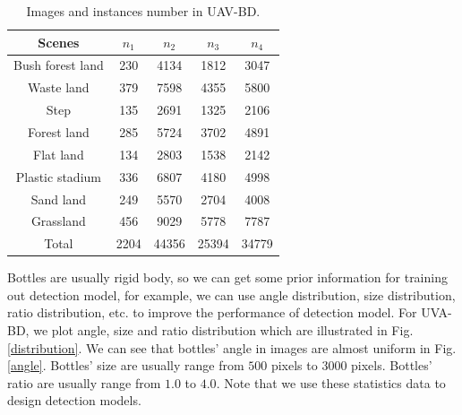 \begin{table}
	\centering
	\small
	\caption{Images and instances number in UAV-BD.}
	\label{statistics}
	\begin{tabular}{@{}ccc|cc@{}}
		\toprule
		Scenes     & $n_1$& $n_2$ & $n_3$ & $n_4$  \\ \midrule
		Bush forest land       & 230  & 4134  & 1812  & 3047  \\
		Waste land     & 379  & 7598  & 4355  & 5800  \\
		Step       & 135  & 2691  & 1325  & 2106  \\
		Forest land    & 285  & 5724  & 3702  & 4891  \\
		Flat land       & 134  & 2803  & 1538  & 2142  \\
		Plastic stadium & 336  & 6807  & 4180  & 4998  \\
		Sand land       & 249  & 5570  & 2704  & 4008  \\
		Grassland       & 456  & 9029  & 5778  & 7787  \\ \midrule
		Total      & 2204 & 44356 & 25394 & 34779 \\ \bottomrule
	\end{tabular}
\end{table}


Bottles are usually rigid body, so we can get some prior information for training out detection model, for example, we can use angle distribution, size distribution, ratio distribution, etc. to improve the performance of detection model. For UVA-BD, we plot angle, size and ratio distribution which are illustrated in Fig.\ref{distribution}. We can see that bottles' angle in images are almost uniform in Fig.\ref{angle}. Bottles' size are usually range from $500 $  pixels to $ 3000 $ pixels. Bottles' ratio are usually range from $ 1.0 $ to $ 4.0 $. Note that we use these statistics data to design detection models.


